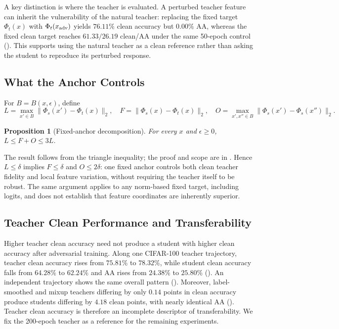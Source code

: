 \documentclass{article} %
\theoremstyle{plain}
\newtheorem{proposition}{Proposition}
\begin{document}
A key distinction is where the teacher is evaluated. A perturbed teacher
feature can inherit the vulnerability of the natural teacher: replacing the
fixed target \(\Phi_t(x)\) with \(\Phi_t(x_{\rm adv})\) yields
\(76.11\%\) clean accuracy but \(0.00\%\) AA, whereas the fixed clean target
reaches \(61.33/26.19\) clean/AA under the same 50-epoch control
(). This supports using the natural teacher as a clean
reference rather than asking the student to reproduce its perturbed response.

\subsection{What the Anchor Controls}
\label{sec:decomp}
For \(B=B(x,\epsilon)\), define
\begin{equation}
L=\max_{x'\in B}\|\Phi_s(x')-\Phi_t(x)\|_2,\quad
F=\|\Phi_s(x)-\Phi_t(x)\|_2,\quad
O=\max_{x',x''\in B}\|\Phi_s(x')-\Phi_s(x'')\|_2.
\end{equation}
\begin{proposition}[Fixed-anchor decomposition]\label{prop:decomp}
For every \(x\) and \(\epsilon\ge0\), \(L\le F+O\le3L\).
\end{proposition}
The result follows from the triangle inequality; the proof and scope are in
. Hence \(L\le\delta\) implies \(F\le\delta\) and
\(O\le2\delta\): one fixed anchor controls both clean teacher fidelity and
local feature variation, without requiring the teacher itself to be robust.
The same argument applies to any norm-based fixed target, including logits,
and does not establish that feature coordinates are inherently superior.

\subsection{Teacher Clean Performance and Transferability}
\label{sec:teacher_transfer}
Higher teacher clean accuracy need not produce a student with higher clean
accuracy after adversarial training. Along one CIFAR-100 teacher trajectory,
teacher clean accuracy rises from \(75.81\%\) to \(78.32\%\), while student
clean accuracy falls from \(64.28\%\) to \(62.24\%\) and AA rises from
\(24.38\%\) to \(25.80\%\) (). An independent
trajectory shows the same overall pattern ().
Moreover, label-smoothed and mixup teachers differing by only \(0.14\) points
in clean accuracy produce students differing by \(4.18\) clean points, with
nearly identical AA (). Teacher clean accuracy is
therefore an incomplete descriptor of transferability. We fix the 200-epoch
teacher as a reference for the remaining experiments.
\end{document}
